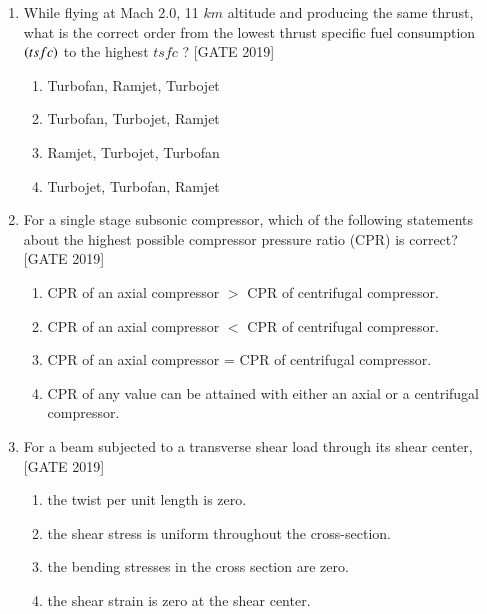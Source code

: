 \documentclass[journal,12pt,onecolumn]{IEEEtran}
\theoremstyle{remark}
\begin{document}
\begin{enumerate}
\item While flying at Mach 2.0, 11  $km$   altitude and producing the same thrust, what is the correct order from the lowest thrust specific fuel consumption $\left(tsfc\right)$ to the highest $ tsfc $ ?
    \hfill{[GATE 2019]}
    \begin{multicols}{2}
        \begin{enumerate}
            \item Turbofan, Ramjet, Turbojet
            \item Turbofan, Turbojet, Ramjet
            \item Ramjet, Turbojet, Turbofan
            \item Turbojet, Turbofan, Ramjet
        \end{enumerate}
    \end{multicols}

    \item For a single stage subsonic compressor, which of the following statements about the highest possible compressor pressure ratio (CPR) is correct?
    \hfill{[GATE 2019]}
   
        \begin{enumerate}
            \item CPR of an axial compressor $>$ CPR of centrifugal compressor.
            \item CPR of an axial compressor $<$ CPR of centrifugal compressor.
            \item CPR of an axial compressor = CPR of centrifugal compressor.
            \item CPR of any value can be attained with either an axial or a centrifugal compressor.
        \end{enumerate}
 

    \item For a beam subjected to a transverse shear load through its shear center,
    \hfill{[GATE 2019]}
    
        \begin{enumerate}
            \item the twist per unit length is zero.
            \item the shear stress is uniform throughout the cross-section.
            \item the bending stresses in the cross section are zero.
            \item the shear strain is zero at the shear center.
        \end{enumerate}
    



\end{enumerate}
\end{document}
